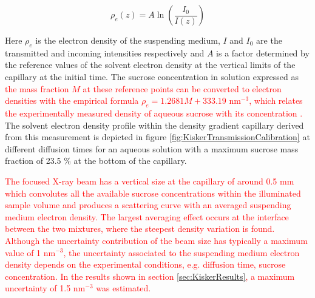 \begin{equation}
  \rho_e(z) = A \ln\left( \frac{I_0}{I(z)} \right)%
\end{equation}

Here \(\rho_e\) is the electron density of the suspending medium, $I$ and $I_0$ are the transmitted and incoming intensities respectively and $A$ is a factor determined by the reference values of the solvent electron density at the vertical limits of the capillary at the initial time. The sucrose concentration in solution expressed as \textcolor{red}{the mass fraction \( M \) at these reference points can be converted to electron densities with the empirical formula \( \rho_e=1.2681M+333.19 \) nm\(^{-3}\), which relates the experimentally measured density of aqueous sucrose with its concentration \citep{haynes_crc_2012}.} The solvent electron density profile within the density gradient capillary derived from this measurement is depicted in figure \ref{fig:KiskerTransmissionCalibration} at different diffusion times for an aqueous solution with a maximum sucrose mass fraction of 23.5 $\%$ at the bottom of the capillary. 

\textcolor{red}{The focused X-ray beam has a vertical size at the capillary of around 0.5 mm which convolutes all the available sucrose concentrations within the illuminated sample volume and produces a scattering curve with an averaged suspending medium electron density. The largest averaging effect occurs at the interface between the two mixtures, where the steepest density variation is found. Although the uncertainty contribution of the beam size has typically a maximum value of 1 nm$^{-3}$, the uncertainty associated to the suspending medium electron density depends on the experimental conditions, e.g. diffusion time, sucrose concentration. In the results shown in section \ref{sec:KiskerResults}, a maximum uncertainty of 1.5 nm$^{-3}$ was estimated.}




\begin{figure*}%
	\centering
		
		\caption[Calibration of the solvent electron density by X-ray transmission.]{Solvent density along the gradient capillary vertical axis at different diffusion times, calculated from the transmission measurements at 5500 eV \textcolor{red}{of an aqueous solution with a maximum sucrose mass fraction of 23.5 $\%$ at the bottom of the capillary}. The corresponding X-ray transmission is shown on the right axis, revealing the low transmittances of the filled capillary at low energies.}
		\label{fig:KiskerTransmissionCalibration}
\end{figure*}


